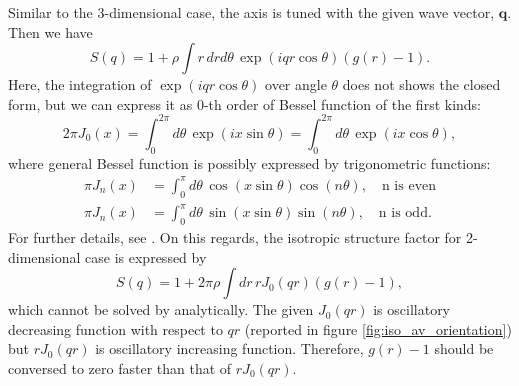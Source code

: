 \documentclass[10pt, a4paper]{article}
\begin{document}
\begin{appendices}
 Similar to the 3-dimensional case, the axis is tuned with the given wave vector, $\mathbf{q}$. Then we have
    \begin{equation}
      S(q) = 1 + \rho \int r\,drd\theta\, \exp(iqr \cos\theta)(g(r) - 1).
    \end{equation}
    Here, the integration of $\exp(iqr \cos\theta)$ over angle $\theta$ does not shows the closed form, but we can express it as 0-th order of Bessel function of the first kinds:
    \begin{equation}
      2\pi J_0(x) = \int_{0}^{2\pi}d\theta\, \exp(ix\sin\theta) = \int_{0}^{2\pi}d\theta\, \exp(ix\cos\theta),
    \end{equation}
    where general Bessel function is possibly expressed by trigonometric functions:
    \begin{align}
      \pi J_n(x) &= \int_0^{\pi}d\theta\,\cos(x\sin\theta)\cos (n\theta) , \quad\textrm{n is even} \\
      \pi J_n(x) &= \int_0^{\pi}d\theta\,\sin(x \sin\theta)\sin (n\theta) , \quad\textrm{n is odd}.
    \end{align}
    For further details, see \textcite{arfken2008mathematical}.
    On this regards, the isotropic structure factor for 2-dimensional case is expressed by
    \begin{equation}
      S(q) = 1 + 2\pi \rho \int dr \,r J_0(qr) (g(r) - 1),
    \end{equation}
    which cannot be solved by analytically. 
    The given $J_0(qr)$ is oscillatory decreasing function with respect to $qr$ (reported in figure \ref{fig:iso_av_orientation}) but $rJ_0(qr)$ is oscillatory increasing function. Therefore, $g(r)-1$ should be conversed to zero faster than that of $rJ_0(qr)$. 


\end{appendices}
\end{document}
